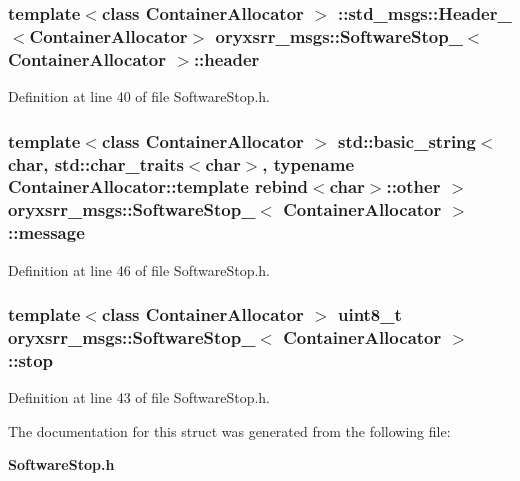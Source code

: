 \subsubsection[{header}]{\setlength{\rightskip}{0pt plus 5cm}template$<$class Container\-Allocator $>$ \-::std\-\_\-msgs\-::\-Header\-\_\-$<$\-Container\-Allocator$>$ {\bf oryxsrr\-\_\-msgs\-::\-Software\-Stop\-\_\-}$<$ \-Container\-Allocator $>$\-::{\bf header}}\label{structoryxsrr__msgs_1_1SoftwareStop___adab583213f0a398afb00a528312217a0}


\-Definition at line 40 of file \-Software\-Stop.\-h.

\subsubsection[{message}]{\setlength{\rightskip}{0pt plus 5cm}template$<$class Container\-Allocator $>$ std\-::basic\-\_\-string$<$char, std\-::char\-\_\-traits$<$char$>$, typename \-Container\-Allocator\-::template rebind$<$char$>$\-::other $>$ {\bf oryxsrr\-\_\-msgs\-::\-Software\-Stop\-\_\-}$<$ \-Container\-Allocator $>$\-::{\bf message}}\label{structoryxsrr__msgs_1_1SoftwareStop___acc70239f88ec74fde94a6dc453bf4676}


\-Definition at line 46 of file \-Software\-Stop.\-h.

\subsubsection[{stop}]{\setlength{\rightskip}{0pt plus 5cm}template$<$class Container\-Allocator $>$ uint8\-\_\-t {\bf oryxsrr\-\_\-msgs\-::\-Software\-Stop\-\_\-}$<$ \-Container\-Allocator $>$\-::{\bf stop}}\label{structoryxsrr__msgs_1_1SoftwareStop___a7eb8ba513f38c0b0ea2d00d165bc5770}


\-Definition at line 43 of file \-Software\-Stop.\-h.



\-The documentation for this struct was generated from the following file\-:\begin{DoxyCompactItemize}
\item 
{\bf \-Software\-Stop.\-h}\end{DoxyCompactItemize}
